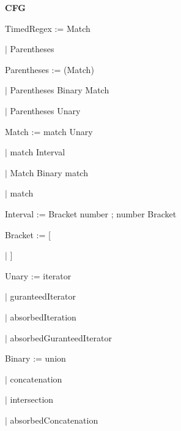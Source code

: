 
\textbf{CFG}

TimedRegex := Match

\qquad	$\mid$ Parentheses

Parentheses := (Match)

\qquad	$\mid$ Parentheses Binary Match

\qquad	$\mid$ Parentheses Unary

Match := match Unary

\qquad	$\mid$ match Interval

\qquad    $\mid$ Match Binary match

\qquad	$\mid$ match

Interval := Bracket number ; number Bracket

Bracket := [

\qquad	$\mid$ ]

Unary := iterator

\qquad	$\mid$ guranteedIterator

\qquad	$\mid$ absorbedIteration

\qquad	$\mid$ absorbedGuranteedIterator

Binary := union

\qquad	$\mid$ concatenation

\qquad	$\mid$ intersection

\qquad	$\mid$ absorbedConcatenation


